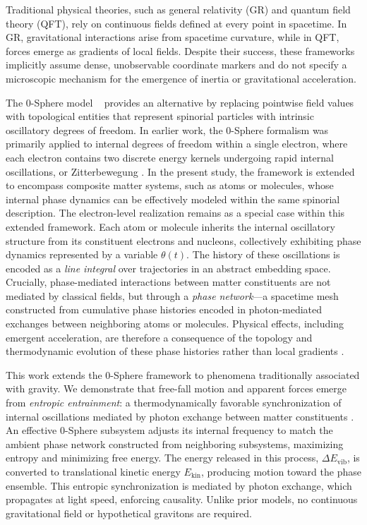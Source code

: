 \documentclass[
 reprint,
 amsmath,amssymb,
 aps,
 prb,
]{revtex4-2}
\numberwithin{equation}{section}
\begin{document}
Traditional physical theories, such as general relativity (GR) \cite{Einstein1916} and quantum field theory (QFT), rely on continuous fields defined at every point in spacetime. In GR, gravitational interactions arise from spacetime curvature, while in QFT, forces emerge as gradients of local fields. Despite their success, these frameworks implicitly assume dense, unobservable coordinate markers and do not specify a microscopic mechanism for the emergence of inertia or gravitational acceleration.

The 0-Sphere model ~\cite{Hanamura2025Trilogy1,Hanamura2026Trilogy2,Hanamura2026Trilogy3} provides an alternative by replacing pointwise field values with topological entities that represent spinorial particles with intrinsic oscillatory degrees of freedom. In earlier work, the 0-Sphere formalism was primarily applied to internal degrees of freedom within a single electron, where each electron contains two discrete energy kernels undergoing rapid internal oscillations, or Zitterbewegung \cite{Schrodinger1930,Dirac1928,Barut1981}. In the present study, the framework is extended to encompass composite matter systems, such as atoms or molecules, whose internal phase dynamics can be effectively modeled within the same spinorial description. The electron-level realization remains as a special case within this extended framework. Each atom or molecule inherits the internal oscillatory structure from its constituent electrons and nucleons, collectively exhibiting phase dynamics represented by a variable $\theta(t)$. The history of these oscillations is encoded as a \textit{line integral} over trajectories in an abstract embedding space. Crucially, phase-mediated interactions between matter constituents are not mediated by classical fields, but through a \textit{phase network}—a spacetime mesh constructed from cumulative phase histories encoded in photon-mediated exchanges between neighboring atoms or molecules. Physical effects, including emergent acceleration, are therefore a consequence of the topology and thermodynamic evolution of these phase histories rather than local gradients \cite{Hanamura2026Trilogy3,AharonovBohm1959,Berry1984,WilsonLoop1974}.

This work extends the 0-Sphere framework to phenomena traditionally associated with gravity. We demonstrate that free-fall motion and apparent forces emerge from \textit{entropic entrainment}: a thermodynamically favorable synchronization of internal oscillations mediated by photon exchange between matter constituents \cite{Pikovsky2001,Strogatz2000,Bennett2002}. An effective 0-Sphere subsystem adjusts its internal frequency to match the ambient phase network constructed from neighboring subsystems, maximizing entropy and minimizing free energy. The energy released in this process, $\Delta E_\text{vib}$, is converted to translational kinetic energy $E_\text{kin}$, producing motion toward the phase ensemble. This entropic synchronization is mediated by photon exchange, which propagates at light speed, enforcing causality. Unlike prior models, no continuous gravitational field or hypothetical gravitons are required.
\end{document}
